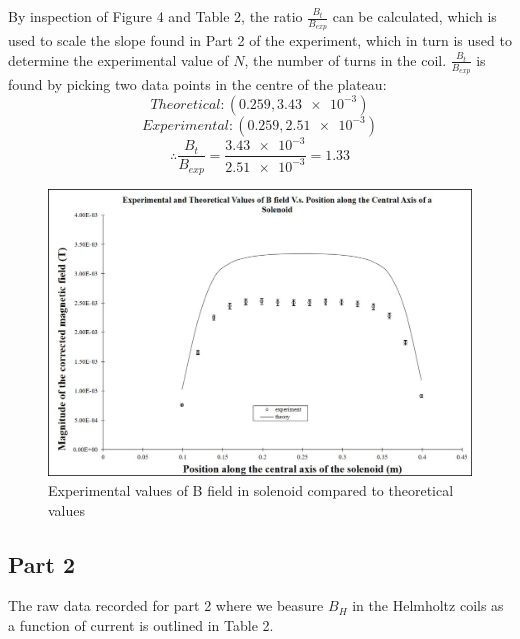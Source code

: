 \documentclass[letterpaper]{article}
\begin{document}
By inspection of Figure 4 and Table 2, the ratio $\frac{B_t}{B_{exp}}$ can
be calculated, which is used to scale the slope found in Part 2 of the experiment,
which in turn is used to determine the experimental value of $N$, the number of turns in the coil.
$\frac{B_t}{B_{exp}}$ is found by picking two data points in the centre of the plateau:
$${Theoretical: } (0.259, \num{3.43e-3})$$
$${Experimental: } (0.259, \num{2.51e-3})$$
$$\therefore \frac{B_t}{B_{exp}}= \frac{\num{3.43e-3}}{\num{2.51e-3}}=1.33$$
\begin{figure}[H]
    \centering
    \includegraphics[width=\textwidth]{part1graph.jpg}
    \caption{Experimental values of B field in solenoid compared to theoretical values}
\end{figure}


\subsection{Part 2}

The raw data recorded for part 2 where we beasure $B_H$ in the
Helmholtz coils as a function of current is outlined in Table 2.
\end{document}
